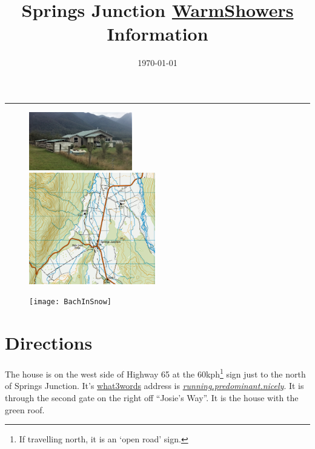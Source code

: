 \documentclass[12pt]{article} %
\title{Springs Junction \href{https://www.warmshowers.org/}{WarmShowers} Information}
\date{\today} %
\makeatletter
\renewcommand{\maketitle}{%
  \begin{center}
    {\bfseries{\scshape{\Large{\@title\par}}}}
  \end{center}
  \medskip
  \begin{flushright}
    {\@date\par}
  \end{flushright}
    \bigskip\hrule\vspace*{2pc}%
}
\makeatother
\begin{document}
  \maketitle

\begin{figure}[t]
\begin{minipage}{.3\linewidth}
\begin{flushleft} 
   \includegraphics[width=4.5cm]{BachPhoto}
\end{flushleft} 
\end{minipage}
\begin{minipage}{.3\linewidth}
\begin{center} 
   \includegraphics[width=5.5cm]{BachLocation}
\end{center} 
\end{minipage}
\hspace{.05\linewidth}
\begin{minipage}{.3\linewidth}
\begin{flushright} 
    \texttt{[image: BachInSnow]}
\end{flushright} 
\end{minipage}
\end{figure}

\section{Directions}
  The house is on the west side of Highway 65 at the 60kph\footnote{If travelling north, it is an `open road' sign.} sign just to the north of Springs Junction.  It's \href{https://map.what3words.com}{what3words} address is \textit{\href{https://map.what3words.com/running.predominant.nicely}{running.predominant.nicely}}.  It is through the second gate on the right off ``Josie's Way''.  It is the house with the green roof.
\end{document}
